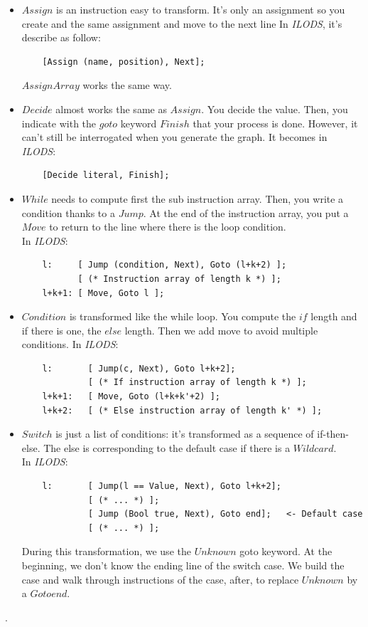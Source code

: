 \documentclass{article}
\begin{document}
\begin{itemize}
  \item $Assign$ is an instruction easy to transform. It's only an assignment so you create and the same assignment and move  to the next line In \textit{ILODS}, it's describe as follow:
  \begin{lstlisting}
    [Assign (name, position), Next];
  \end{lstlisting}
  $AssignArray$ works the same way. 
  
  \item $Decide$ almost works the same as $Assign$. You decide the value. Then, you indicate with the $goto$ keyword $Finish$ that your process is done. However, it can't still be interrogated when you generate the graph. It becomes in \textit{ILODS}:
  \begin{lstlisting}
    [Decide literal, Finish];
  \end{lstlisting}
  \item $While$ needs to compute first the sub instruction array. Then, you write a condition thanks to a $Jump$. 
  At the end of the instruction array, you put a $Move$ to return to the line where there is the loop condition.  \\
  In \textit{ILODS}:
  \begin{lstlisting}
    l:     [ Jump (condition, Next), Goto (l+k+2) ];
           [ (* Instruction array of length k *) ];
    l+k+1: [ Move, Goto l ];
  \end{lstlisting}
  
  \item $Condition$ is transformed like the while loop. You compute the $if$ length and if there is one, the $else$ length. Then we add move to avoid multiple conditions. In \textit{ILODS}:
  \begin{lstlisting}
    l:       [ Jump(c, Next), Goto l+k+2];
             [ (* If instruction array of length k *) ];
    l+k+1:   [ Move, Goto (l+k+k'+2) ];
    l+k+2:   [ (* Else instruction array of length k' *) ];
  \end{lstlisting}

  \item $Switch$ is just a list of conditions: it's transformed as a sequence of if-then-else. The else is corresponding to the default case if there is a $Wildcard$. \\
  In \textit{ILODS}:
  \begin{lstlisting}
    l:       [ Jump(l == Value, Next), Goto l+k+2];
             [ (* ... *) ];
             [ Jump (Bool true, Next), Goto end];   <- Default case 
             [ (* ... *) ];
  \end{lstlisting}
  During this transformation, we use the $Unknown$ goto keyword. At the beginning, we don't know the ending line of the switch case. We build the case and walk through instructions of the case, after, to replace $Unknown$ by a $Goto end$.
\end{itemize}.
\end{document}
